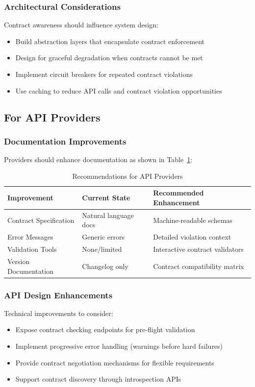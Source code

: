 \documentclass[11pt]{article}
\begin{document}
\subsubsection{Architectural Considerations}
Contract awareness should influence system design:
\begin{itemize}
    \item Build abstraction layers that encapsulate contract enforcement
    \item Design for graceful degradation when contracts cannot be met
    \item Implement circuit breakers for repeated contract violations
    \item Use caching to reduce API calls and contract violation opportunities
\end{itemize}

\subsection{For API Providers}

\subsubsection{Documentation Improvements}
Providers should enhance documentation as shown in Table~\ref{tab:provider_recommendations}:

\begin{table}[h]
\centering
\caption{Recommendations for API Providers}
\label{tab:provider_recommendations}
\begin{tabular}{p{3.5cm}p{5cm}p{4.5cm}}
\toprule
\textbf{Improvement} & \textbf{Current State} & \textbf{Recommended Enhancement} \\
\midrule
Contract Specification & Natural language docs & Machine-readable schemas \\
Error Messages & Generic errors & Detailed violation context \\
Validation Tools & None/limited & Interactive contract validators \\
Version Documentation & Changelog only & Contract compatibility matrix \\
\bottomrule
\end{tabular}
\end{table}

\subsubsection{API Design Enhancements}
Technical improvements to consider:
\begin{itemize}
    \item Expose contract checking endpoints for pre-flight validation
    \item Implement progressive error handling (warnings before hard failures)
    \item Provide contract negotiation mechanisms for flexible requirements
    \item Support contract discovery through introspection APIs
\end{itemize}
\end{document}
